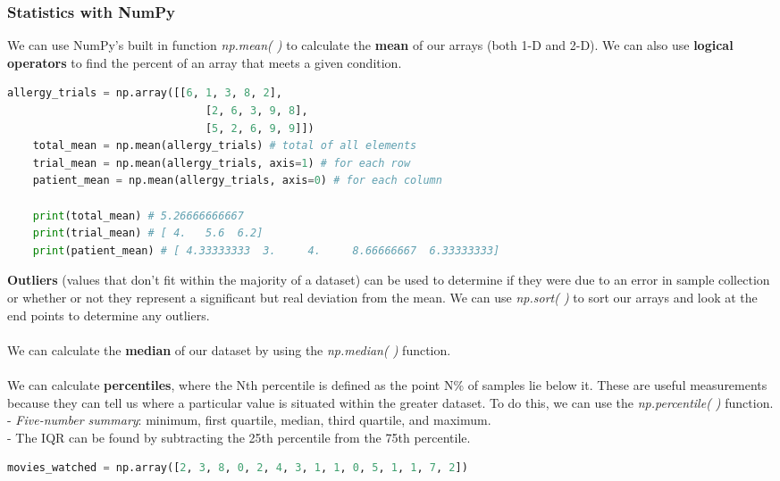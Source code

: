 \documentclass[11pt, a4paper]{article}
\begin{document}
\begin{spacing}{1.1}
	\subsubsection{Statistics with NumPy}
	We can use NumPy's built in function \textit{np.mean( )} to calculate the \textbf{mean} of our arrays (both 1-D and 2-D). We can also use \textbf{logical operators} to find the percent of an array that meets a given condition.
	\begin{lstlisting}[language=Python]
	allergy_trials = np.array([[6, 1, 3, 8, 2], 
	                           [2, 6, 3, 9, 8], 
	                           [5, 2, 6, 9, 9]])
	total_mean = np.mean(allergy_trials) # total of all elements
	trial_mean = np.mean(allergy_trials, axis=1) # for each row
	patient_mean = np.mean(allergy_trials, axis=0) # for each column
	
	print(total_mean) # 5.26666666667
	print(trial_mean) # [ 4.   5.6  6.2]
	print(patient_mean)	# [ 4.33333333  3.     4.     8.66666667  6.33333333] \end{lstlisting} \newpage

	\noindent \textbf{Outliers} (values that don’t fit within the majority of a dataset) can be used to determine if they were due to an error in sample collection or whether or not they represent a significant but real deviation from the mean. We can use \textit{np.sort( )} to sort our arrays and look at the end points to determine any outliers. \\~\\
	We can calculate the \textbf{median} of our dataset by using the \textit{np.median( )} function. \\~\\
	We can calculate \textbf{percentiles}, where the Nth percentile is defined as the point N\% of samples lie below it. These are useful measurements because they can tell us where a particular value is situated within the greater dataset. To do this, we can use the \textit{np.percentile( )} function. \\
	\hspace*{3mm} - \textit{Five-number summary}: minimum, first quartile, median, third quartile, and maximum. \\
	\hspace*{3mm} - The IQR can be found by subtracting the 25th percentile from the 75th percentile.
	\begin{lstlisting}[language=Python]
	movies_watched = np.array([2, 3, 8, 0, 2, 4, 3, 1, 1, 0, 5, 1, 1, 7, 2])
	

\end{lstlisting}
\end{spacing}
\end{document}
